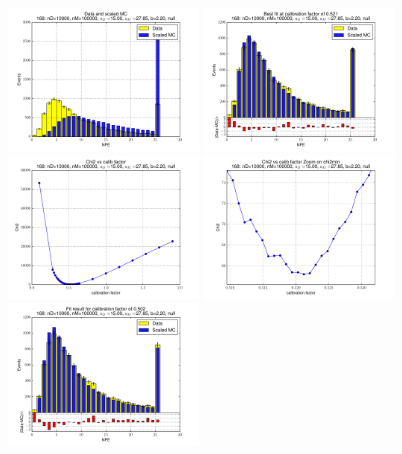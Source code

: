 
 \begin{figure}[htbp] \begin{center} 
\includegraphics[width=0.45\textwidth]{../FIGURES/168/FIG_Data_and_scaled_MC.pdf} 
\includegraphics[width=0.45\textwidth]{../FIGURES/168/FIG_Best_fit_at_calibration_factor_of_0_521.pdf} 
\includegraphics[width=0.45\textwidth]{../FIGURES/168/FIG_Chi2_vs_calib_factor.pdf} 
\includegraphics[width=0.45\textwidth]{../FIGURES/168/FIG_Chi2_vs_calib_factor_Zoom_on_chi2min.pdf} 
\includegraphics[width=0.45\textwidth]{../FIGURES/168/FIG_Fit_result_for_calibration_factor_of_0_502.pdf} 

\end{center}
\end{figure}
